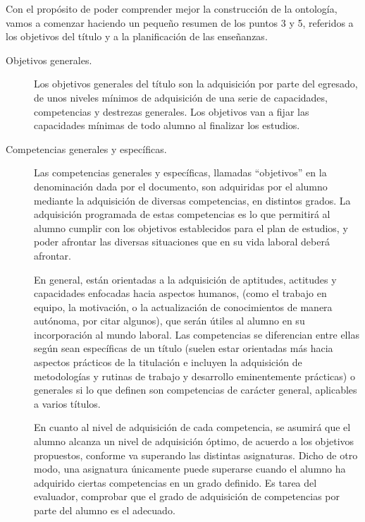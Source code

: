 Con el propósito de poder comprender mejor la construcción de la ontología, vamos a comenzar haciendo un pequeño resumen de los puntos 3 y 5, referidos a los objetivos del título y a la planificación de las enseñanzas.

\begin{description}
	\item [Objetivos generales.]Los objetivos generales del título son la adquisición por parte del egresado, de unos niveles mínimos de adquisición de una serie de capacidades, competencias y destrezas generales. Los objetivos van a fijar las capacidades mínimas de todo alumno al finalizar los estudios.
 
	\item [Competencias generales y específicas.]Las competencias generales y específicas, llamadas ``objetivos'' en la denominación dada por el documento, son adquiridas por el alumno mediante la adquisición de diversas competencias, en distintos grados. La adquisición programada de estas competencias es lo que permitirá al alumno cumplir con los objetivos establecidos para el plan de estudios, y poder afrontar las diversas situaciones que en su vida laboral deberá afrontar.
 
	En general, están orientadas a la adquisición de aptitudes, actitudes y capacidades enfocadas hacia aspectos humanos, (como el trabajo en equipo, la motivación, o la actualización de conocimientos de manera autónoma, por citar algunos), que serán útiles al alumno en su incorporación al mundo laboral. Las competencias se diferencian entre ellas según sean específicas de un título (suelen estar orientadas más hacia aspectos prácticos de la titulación e incluyen la adquisición de metodologías y rutinas de trabajo y desarrollo eminentemente prácticas) o generales si lo que definen son competencias de carácter general, aplicables a varios títulos.
			 
	En cuanto al nivel de adquisición de cada competencia, se asumirá que el alumno alcanza un nivel de adquisición óptimo, de acuerdo a los objetivos propuestos, conforme va superando las distintas asignaturas. Dicho de otro modo, una asignatura únicamente puede superarse cuando el alumno ha adquirido ciertas competencias en un grado definido. Es tarea del evaluador, comprobar que el grado de adquisición de competencias por parte del alumno es el adecuado.


\end{description}
